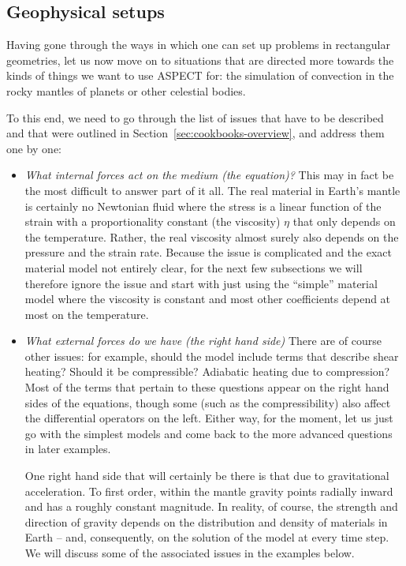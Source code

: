 \documentclass{article}
\newcommand{\aspect}{\textsc{ASPECT}}
\begin{document}
\subsection{Geophysical setups}
\label{sec:cookbooks-geophysical}

Having gone through the ways in which one can set up problems in rectangular
geometries, let us now move on to situations that are directed more towards the
kinds of things we want to use \aspect{} for: the simulation of convection in
the rocky mantles of planets or other celestial bodies.

To this end, we need to go through the list of issues that have to be described
and that were outlined in Section~\ref{sec:cookbooks-overview}, and address them
one by one:
\begin{itemize}
  \item \textit{What internal forces act on the medium (the equation)?}
    This may in fact be the most difficult to answer part of it all. The real
    material in Earth's mantle is certainly no Newtonian fluid where the stress
    is a linear function of the strain with a proportionality constant (the
    viscosity) $\eta$ that only depends on the temperature. Rather, the
    real viscosity almost surely also depends on the pressure and the strain
    rate. Because the issue is complicated and the exact material model not
    entirely clear, for the next few subsections we will therefore ignore the
    issue and start with just using the ``simple'' material model where the
    viscosity is constant and most other coefficients depend at most on the
    temperature.

  \item \textit{What external forces do we have (the right hand side)}
    There are of course other issues: for example, should the model include terms
    that describe shear heating? Should it be compressible? Adiabatic heating due
    to compression? Most of the terms that pertain to these questions appear on
    the right hand sides of the equations, though some (such as the
    compressibility) also affect the differential operators on the left. Either
    way, for the moment, let us just go with the simplest models and come back to
    the more advanced questions in later examples.

    One right hand side that will certainly be there is that due to gravitational
    acceleration. To first order, within the mantle gravity points radially
    inward and has a roughly constant magnitude. In reality, of course, the
    strength and direction of gravity depends on the distribution and density of
    materials in Earth -- and, consequently, on the solution of the model at
    every time step. We will discuss some of the associated issues in the
    examples below.


\end{itemize}
\end{document}
